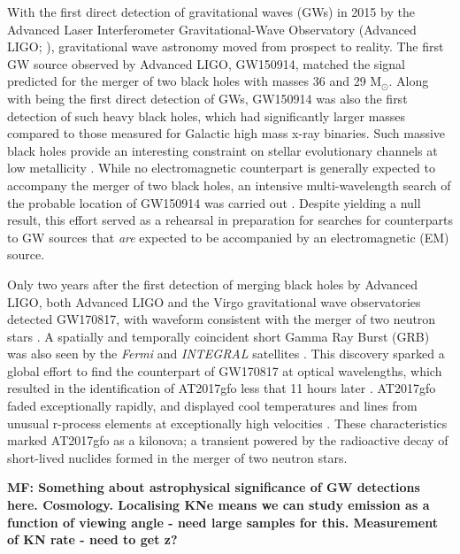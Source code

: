 \documentclass{aa}
\begin{document}
With the first direct detection of gravitational waves (GWs) in 2015 by the Advanced Laser Interferometer Gravitational-Wave
Observatory (Advanced LIGO; \citealp{FirstGW}), gravitational wave astronomy moved from prospect to reality. The first GW source observed by Advanced LIGO, GW150914, matched the signal predicted for the merger of two black holes with masses 36 and 29 M$_{\odot}$. Along with being the first direct detection of GWs, GW150914 was also the first detection of such heavy black holes, which had significantly larger masses compared to those measured for Galactic high mass x-ray binaries. Such massive black holes provide an interesting constraint on stellar evolutionary channels at low metallicity \citep[e.g.][]{FirstGW_astro, Belc16}. While no electromagnetic counterpart is generally expected to accompany the merger of two black holes, an intensive multi-wavelength search of the probable location of GW150914 was carried out \citep{FirstGW_EM}. Despite yielding a null result, this effort served as a rehearsal in preparation for searches for counterparts to GW sources that {\it are} expected to be accompanied by an electromagnetic (EM) source.

Only two years after the first detection of merging black holes by Advanced LIGO, both Advanced LIGO and the Virgo gravitational wave observatories detected GW170817, with waveform consistent with the merger of two neutron stars \citep{GW170817}. A spatially and temporally coincident short Gamma Ray Burst (GRB) was also seen by the {\it Fermi} and {\it INTEGRAL} satellites \citep{GW170817_GRB}. This discovery sparked a global effort to find the counterpart of GW170817 at optical wavelengths, which resulted in the identification of AT2017gfo less that 11 hours later \citep{GW170817_EM}. AT2017gfo faded exceptionally rapidly, and displayed cool temperatures and lines from unusual r-process elements at exceptionally high velocities \citep{Smar17,Arca17,Pian17,Coul17,Kilp17}. These characteristics marked AT2017gfo as a kilonova; a transient powered by the radioactive decay of short-lived nuclides formed in the merger of two neutron stars.

{\bf MF: Something about astrophysical significance of GW detections here. Cosmology. Localising KNe means we can study emission as a function of viewing angle - need large samples for this. Measurement of KN rate - need to get z?}
\end{document}
